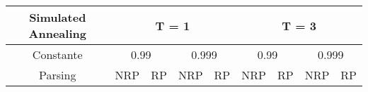 \documentclass[8pt]{article}
\begin{document}
\begin{table}[h]
	\begin{tabular}{|c|cccccccc|cccccccc|}
		\hline
		Simulated Annealing & \multicolumn{8}{c|}{T  = 1}                       & \multicolumn{8}{c|}{T = 3}                                                                                                                                                                                                                                                                                                                                                                                                                                                                                                                                                                                                                                                                                                                        \\ \hline
		Constante           & \multicolumn{4}{c|}{\cellcolor[HTML]{F7DFDF}0.99} & \multicolumn{4}{c|}{\cellcolor[HTML]{FFEBEB}0.999} & \multicolumn{4}{c|}{\cellcolor[HTML]{BBE0E9}0.99} & \multicolumn{4}{c|}{\cellcolor[HTML]{D6F7FF}0.999}                                                                                                                                                                                                                                                                                                                                                                                                                                                                                                                                                                                       \\ \hline
		Parsing             & \multicolumn{3}{c|}{\cellcolor[HTML]{F7DFDF}NRP}  & \multicolumn{1}{c|}{\cellcolor[HTML]{F7DFDF}RP}    & \multicolumn{3}{c|}{\cellcolor[HTML]{FFEBEB}NRP}  & \cellcolor[HTML]{FFEBEB}RP                         & \multicolumn{3}{c|}{\cellcolor[HTML]{BBE0E9}NRP} & \multicolumn{1}{c|}{\cellcolor[HTML]{BBE0E9}RP}  & \multicolumn{3}{c|}{\cellcolor[HTML]{D6F7FF}NRP} & \cellcolor[HTML]{D6F7FF}RP                                                                                                                                                                                                                                                                                                                                                                                                 \\ \hline

\end{tabular}
\end{table}
\end{document}
